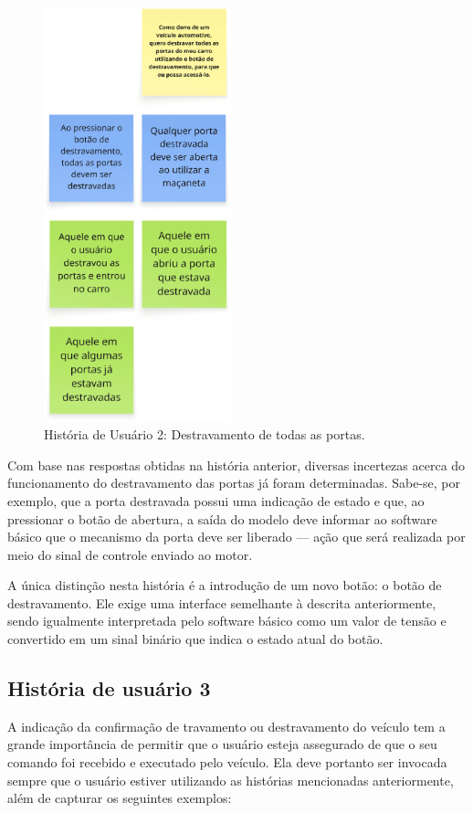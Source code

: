 \begin{figure}[H]
\centering
\includegraphics[height=12cm]{figuras/user_story_2.png}
\caption{História de Usuário 2: Destravamento de todas as portas.}
\end{figure}

Com base nas respostas obtidas na história anterior, diversas incertezas acerca do funcionamento do destravamento das portas já foram determinadas. Sabe-se, 
por exemplo, que a porta destravada possui uma indicação de estado e que, ao pressionar o botão de abertura, a saída do modelo deve informar ao software básico 
que o mecanismo da porta deve ser liberado — ação que será realizada por meio do sinal de controle enviado ao motor.

A única distinção nesta história é a introdução de um novo botão: o botão de destravamento. Ele exige uma interface semelhante à descrita anteriormente, sendo 
igualmente interpretada pelo software básico como um valor de tensão e convertido em um sinal binário que indica o estado atual do botão.

\subsection{História de usuário 3}

A indicação da confirmação de travamento ou destravamento do veículo tem a grande importância de permitir que o usuário esteja assegurado de que o seu comando foi 
recebido e executado pelo veículo. Ela deve portanto ser invocada sempre que o usuário estiver utilizando as histórias mencionadas anteriormente, além de capturar 
os seguintes exemplos:

